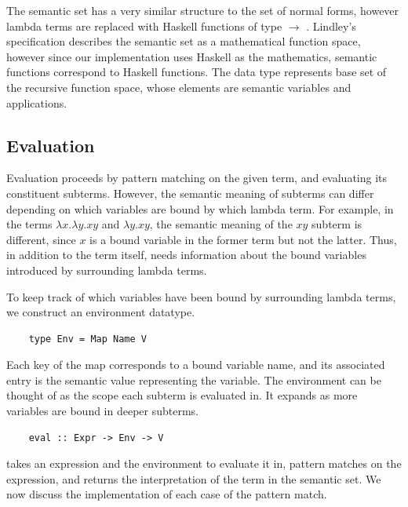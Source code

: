The semantic set  has a very similar structure to the set of normal forms, however lambda terms are replaced with Haskell functions of type  $\rightarrow$ . Lindley's specification \cite{slides} describes the semantic set as a mathematical function space, however since our implementation uses Haskell as the mathematics, semantic functions correspond to Haskell functions. The  data type represents base set of the recursive function space, whose elements are semantic variables and applications.

\vspace{\baselineskip}

\subsection{Evaluation}

Evaluation proceeds by pattern matching on the given term, and evaluating its constituent subterms. However, the semantic meaning of subterms can differ depending on which variables are bound by which lambda term. For example, in the terms $\lambda x . \lambda y . xy$ and $\lambda y . xy$, the semantic meaning of the $xy$ subterm is different, since $x$ is a bound variable in the former term but not the latter. Thus, in addition to the term itself,  needs information about the bound variables introduced by surrounding lambda terms. 

To keep track of which variables have been bound by surrounding lambda terms, we construct an environment datatype.

\begin{lstlisting}
    type Env = Map Name V
\end{lstlisting}

Each key of the map corresponds to a bound variable name, and its associated entry is the semantic value representing the variable. The environment can be thought of as the scope each subterm is evaluated in. 
It expands as more variables are bound in deeper subterms.

\begin{lstlisting}
    eval :: Expr -> Env -> V
\end{lstlisting}

 takes an expression and the environment to evaluate it in, pattern matches on the expression, and returns the interpretation of the term in the semantic set. We now discuss the implementation of each case of the pattern match.

